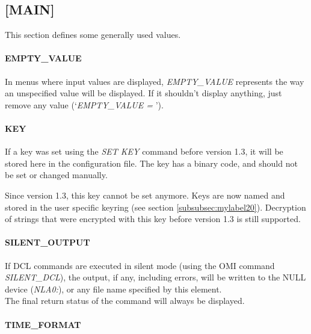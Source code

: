 \documentclass[a4paper]{book}
\newcommand{\vs}{\vspace{3mm}}
\begin{document}
\subsection{[MAIN]}
\label{subsubsec:mylabel16}

This section defines some generally used values.

\paragraph{EMPTY{\_}VALUE}

In menus where input values are displayed, \linebreak\textsl{EMPTY{\_}VALUE} represents the 
way an unspecified value will be displayed. If it shouldn't display 
anything, just remove any value (`\textsl{EMPTY{\_}VALUE =} ').

\paragraph{KEY}

If a key was set using the \textsl{SET KEY} command 
before version 1.3, it will be stored here in the configuration file. The 
key has a binary code, and should not be set or changed manually.

\vs

Since version 1.3, this key cannot be set anymore. Keys are now named and 
stored in the user specific keyring (see section \ref{subsubsec:mylabel20}). \newline
Decryption of strings that were encrypted  with this key before version 1.3 is
still supported.

\paragraph{SILENT{\_}OUTPUT}

If DCL commands are executed in silent mode (using the OMI command 
\textsl{SILENT{\_}DCL}), the output, if any, 
including errors, will be written to the NULL device (\textsl{NLA0:}),
or any file name specified by this element. \\
The final return status of the command will always be displayed.

\paragraph{TIME{\_}FORMAT}
\label{para:mylabel1}
\end{document}
